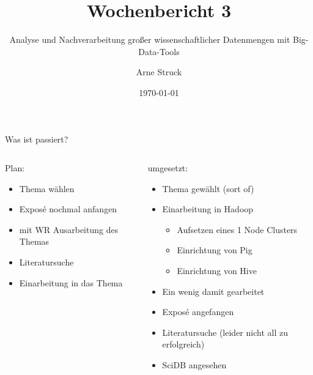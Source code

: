 \documentclass{beamer}
\title{Wochenbericht 3}
\subtitle{Analyse und Nachverarbeitung großer wissenschaftlicher Datenmengen mit Big-Data-Tools}
\author{Arne Struck}
\institute{Universität Hamburg, Fachschaft Informatik, Abschlussarbeitenseminar}
\date{\today}
\begin{document}
\begin{frame}
\maketitle
\end{frame}

\begin{frame}{Was ist passiert?}
\begin{columns}[t]
    \begin{column}{.5\textwidth}      	
      	\begin{block}{Plan:}
        	\begin{itemize}
				\item Thema wählen
	   			\item Exposé nochmal anfangen
		        \item mit WR Ausarbeitung des Themas
				\item Literatursuche
		    	\item Einarbeitung in das Thema
			\end{itemize}
    	\end{block}
    \end{column}
	\begin{column}{.5\textwidth}
		\uncover<2> {
		\begin{block}{umgesetzt:}
        	\begin{itemize}
        		\item Thema gewählt (sort of)
	        	\item Einarbeitung in Hadoop
	        	\begin{itemize}
	        		\item Aufsetzen eines 1 Node Clusters
	        		\item Einrichtung von Pig
	        		\item Einrichtung von Hive 
	        	\end{itemize}
	        	\item Ein wenig damit gearbeitet
    	    	\item Exposé angefangen
    	    	\item Literatursuche (leider nicht all zu erfolgreich)
    	    	\item SciDB angesehen
        	\end{itemize}
		\end{block}
		}
	\end{column}
\end{columns}
\end{frame}
\end{document}
